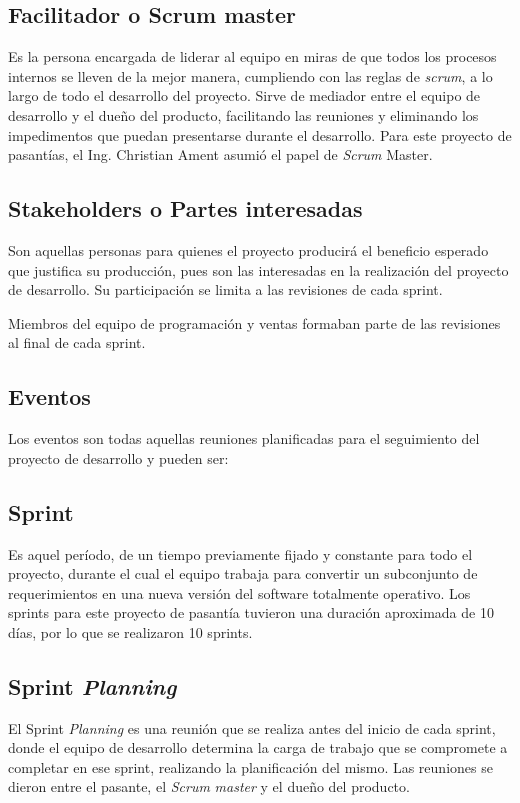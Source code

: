 \subsection{Facilitador o Scrum master}
Es la persona encargada de liderar al equipo en miras de que todos los procesos internos se lleven de la mejor manera, cumpliendo con las reglas de \emph{scrum}, a lo largo de todo el desarrollo del proyecto. Sirve de mediador entre el equipo de desarrollo y el dueño del producto, facilitando las reuniones y eliminando los impedimentos que puedan presentarse durante el desarrollo.
Para este proyecto de pasantías, el Ing. Christian Ament asumió el papel de \emph{Scrum} Master.

\subsection{Stakeholders o Partes interesadas}
Son aquellas personas para quienes el proyecto producirá el beneficio esperado que justifica su producción, pues son las interesadas en la realización del proyecto de desarrollo. Su participación se limita a las revisiones de cada sprint.

Miembros del equipo de programación y ventas formaban parte de las revisiones al final de cada sprint.

\subsection{Eventos}
Los eventos son todas aquellas reuniones planificadas para el seguimiento del proyecto de desarrollo y pueden ser:

\subsection{Sprint}
Es aquel período, de un tiempo previamente fijado y constante para todo el proyecto, durante el cual el equipo trabaja para convertir un subconjunto de requerimientos en una nueva versión del software totalmente operativo. Los sprints para este proyecto de pasantía tuvieron una duración aproximada de 10 días, por lo que se realizaron 10 sprints.

\subsection{Sprint \emph{Planning}}
El Sprint \emph{Planning} es una reunión que se realiza antes del inicio de cada sprint, donde el equipo de desarrollo determina la carga de trabajo que se compromete a completar en ese sprint, realizando la planificación del mismo. Las reuniones se dieron entre el pasante, el \emph{Scrum} \emph{master} y el dueño del producto.


